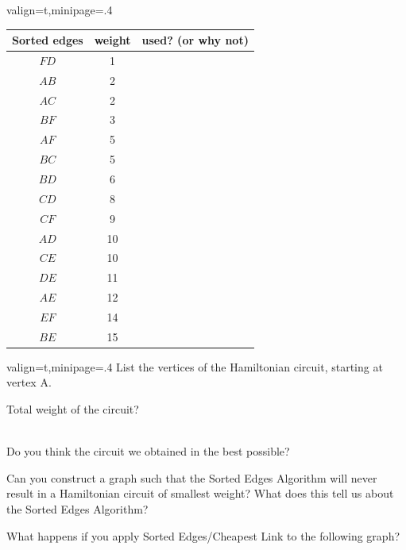 \documentclass[12pt]{article}
\begin{document}
\begin{adjustbox}{valign=t,minipage={.4\linewidth}}
\begin{tabular}{ c | c | c }
Sorted edges & weight & used? (or why not) \\ \hline
$FD$ & 1 & \\ \hline
$AB$ & 2  &\\ \hline
$AC$ & 2 & \\ \hline
$BF$ & 3 &\\ \hline 
$AF$ & 5& \\ \hline
$BC$ & 5 & \\ \hline
$BD$ & 6& \\ \hline
$CD$ & 8& \\  \hline
$CF$ & 9&\\ \hline
$AD$ & 10&\\ \hline
$CE$ & 10 &\\ \hline
$DE$ & 11&\\ \hline
$AE$ & 12& \\ \hline
$EF$ & 14& \\ \hline
$BE$ & 15&\\ \hline
 \end{tabular}
 \end{adjustbox}
%
\hfill
%
\begin{adjustbox}{valign=t,minipage={.4\linewidth}}
List the vertices of the Hamiltonian circuit, starting at vertex A. \\
\quad

\hrulefill

\bigskip

Total weight of the circuit?\\

\quad \\
\bigskip

Do you think the circuit we obtained in the best possible?


 \end{adjustbox}


\newpage
Can you construct a graph such that the Sorted Edges Algorithm will never result in a Hamiltonian circuit of smallest weight? What does this tell us about the Sorted Edges Algorithm?

\vfill 

\vfill

What happens if you apply Sorted Edges/Cheapest Link to the following graph?
\end{document}
